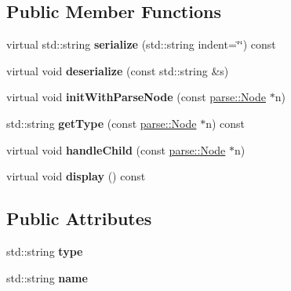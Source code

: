 \subsection*{Public Member Functions}
\begin{DoxyCompactItemize}
\item 
\hypertarget{classg2c_1_1_serializable_a7703791c3f0b805c89cbf0f2ac745ea8}{
virtual std::string {\bfseries serialize} (std::string indent=\char`\"{}\char`\"{}) const }
\label{classg2c_1_1_serializable_a7703791c3f0b805c89cbf0f2ac745ea8}

\item 
\hypertarget{classg2c_1_1_serializable_a9025ace55eef46cbdb91d9ab89a5af4a}{
virtual void {\bfseries deserialize} (const std::string \&s)}
\label{classg2c_1_1_serializable_a9025ace55eef46cbdb91d9ab89a5af4a}

\item 
\hypertarget{classg2c_1_1_serializable_a8e0e60a1fccff6e2bafac5d40d7d45e2}{
virtual void {\bfseries initWithParseNode} (const \hyperlink{classparse_1_1_node}{parse::Node} $\ast$n)}
\label{classg2c_1_1_serializable_a8e0e60a1fccff6e2bafac5d40d7d45e2}

\item 
\hypertarget{classg2c_1_1_serializable_a2d30ad4c317e19cc6a7185a01f6fbb88}{
std::string {\bfseries getType} (const \hyperlink{classparse_1_1_node}{parse::Node} $\ast$n) const }
\label{classg2c_1_1_serializable_a2d30ad4c317e19cc6a7185a01f6fbb88}

\item 
\hypertarget{classg2c_1_1_serializable_a69085ab8cd1a5954abc9c0d1c0e6924c}{
virtual void {\bfseries handleChild} (const \hyperlink{classparse_1_1_node}{parse::Node} $\ast$n)}
\label{classg2c_1_1_serializable_a69085ab8cd1a5954abc9c0d1c0e6924c}

\item 
\hypertarget{classg2c_1_1_serializable_a5e0751d7aaee57369f22a1908dd3d06c}{
virtual void {\bfseries display} () const }
\label{classg2c_1_1_serializable_a5e0751d7aaee57369f22a1908dd3d06c}

\end{DoxyCompactItemize}
\subsection*{Public Attributes}
\begin{DoxyCompactItemize}
\item 
\hypertarget{classg2c_1_1_serializable_ad853f65bf6ac4d5da473e6697bc864f0}{
std::string {\bfseries type}}
\label{classg2c_1_1_serializable_ad853f65bf6ac4d5da473e6697bc864f0}

\item 
\hypertarget{classg2c_1_1_serializable_a7a677c2891a338e516ba522e63414983}{
std::string {\bfseries name}}
\label{classg2c_1_1_serializable_a7a677c2891a338e516ba522e63414983}

\end{DoxyCompactItemize}
